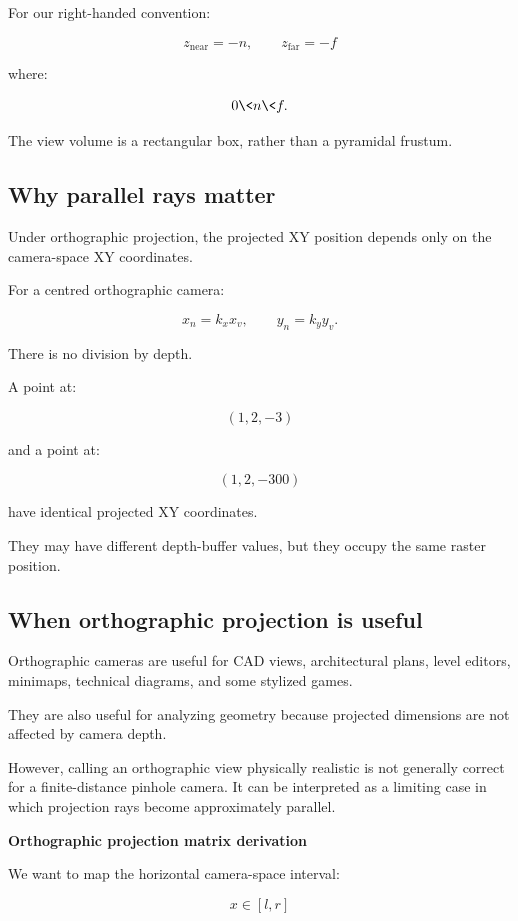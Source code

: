 For our right-handed convention:

\[
 z_{\mathrm{near}}=-n, \qquad z_{\mathrm{far}}=-f
\]

where:

\[
 0\<n\<f.
\]

The view volume is a rectangular box, rather than a pyramidal frustum.

\subsection{Why parallel rays matter}\label{02-foundations-ii-ch033-why-parallel-rays-matter}

Under orthographic projection, the projected XY position depends only on the camera-space XY coordinates.

For a centred orthographic camera:

\[
 x_n=k_xx_v, \qquad y_n=k_yy_v.
\]

There is no division by depth.

A point at:

\[
 (1,2,-3)
\]

and a point at:

\[
 (1,2,-300)
\]

have identical projected XY coordinates.

They may have different depth-buffer values, but they occupy the same raster position.

\subsection{When orthographic projection is useful}\label{02-foundations-ii-ch033-when-orthographic-projection-is-useful}

Orthographic cameras are useful for CAD views, architectural plans, level editors, minimaps, technical diagrams, and some stylized games.

They are also useful for analyzing geometry because projected dimensions are not affected by camera depth.

However, calling an orthographic view physically realistic is not generally correct for a finite-distance pinhole camera. It can be interpreted as a limiting case in which projection rays become approximately parallel.

\textbf{Orthographic projection matrix derivation}

We want to map the horizontal camera-space interval:

\[
 x\in[l,r]
\]

